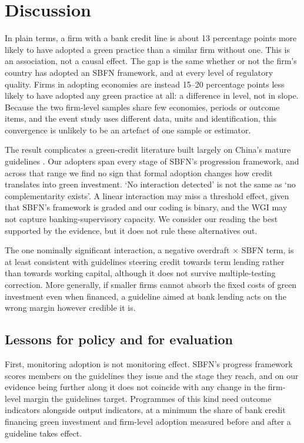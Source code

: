 \documentclass[review,authoryear,12pt]{elsarticle}
\begin{document}
\section{Discussion}
\label{sec:discussion}

In plain terms, a firm with a bank credit line is about 13 percentage points more likely to have adopted a green practice than a similar firm without one. This is an association, not a causal effect. The gap is the same whether or not the firm's country has adopted an SBFN framework, and at every level of regulatory quality. Firms in adopting economies are instead 15--20 percentage points less likely to have adopted any green practice at all: a difference in level, not in slope. Because the two firm-level samples share few economies, periods or outcome items, and the event study uses different data, units and identification, this convergence is unlikely to be an artefact of one sample or estimator.

The result complicates a green-credit literature built largely on China's mature guidelines \citep{dai2025,huang2023,li2023}. Our adopters span every stage of SBFN's progression framework, and across that range we find no sign that formal adoption changes how credit translates into green investment. `No interaction detected' is not the same as `no complementarity exists'. A linear interaction may miss a threshold effect, given that SBFN's framework is graded and our coding is binary, and the WGI may not capture banking-supervisory capacity. We consider our reading the best supported by the evidence, but it does not rule these alternatives out.

The one nominally significant interaction, a negative overdraft $\times$ SBFN term, is at least consistent with guidelines steering credit towards term lending rather than towards working capital, although it does not survive multiple-testing correction. More generally, if smaller firms cannot absorb the fixed costs of green investment even when financed, a guideline aimed at bank lending acts on the wrong margin however credible it is.

\subsection{Lessons for policy and for evaluation}
\label{sec:lessons}

First, monitoring adoption is not monitoring effect. SBFN's progress framework scores members on the guidelines they issue and the stage they reach, and on our evidence being further along it does not coincide with any change in the firm-level margin the guidelines target. Programmes of this kind need outcome indicators alongside output indicators, at a minimum the share of bank credit financing green investment and firm-level adoption measured before and after a guideline takes effect.
\end{document}
